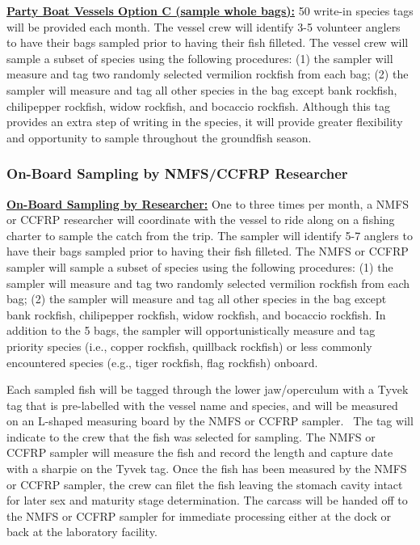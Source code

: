 \documentclass[
  letterpaper,
  DIV=11,
  numbers=noendperiod]{scrartcl}
\begin{document}
\href{https://drive.google.com/file/d/1rIka7pY_DXWL-FqTUodazEqWex9ovj0W/view?usp=sharing}{\textbf{Party
Boat Vessels Option C (sample whole bags):}} 50 write-in species tags
will be provided each month. The vessel crew will identify 3-5 volunteer
anglers to have their bags sampled prior to having their fish filleted.
The vessel crew will sample a subset of species using the following
procedures: (1) the sampler will measure and tag two randomly selected
vermilion rockfish from each bag; (2) the sampler will measure and tag
all other species in the bag except bank rockfish, chilipepper rockfish,
widow rockfish, and bocaccio rockfish. Although this tag provides an
extra step of writing in the species, it will provide greater
flexibility and opportunity to sample throughout the groundfish season.

\hypertarget{on-board-sampling-by-nmfsccfrp-researcher}{%
\subsubsection{On-Board Sampling by NMFS/CCFRP
Researcher}\label{on-board-sampling-by-nmfsccfrp-researcher}}

\href{https://drive.google.com/file/d/1o7kY7kULP_budD7yP4ZCjEFSpdjwJd3N/view?usp=sharing}{\textbf{On-Board
Sampling by Researcher:}} One to three times per month, a NMFS or CCFRP
researcher will coordinate with the vessel to ride along on a fishing
charter to sample the catch from the trip. The sampler will identify 5-7
anglers to have their bags sampled prior to having their fish filleted.
The NMFS or CCFRP sampler will sample a subset of species using the
following procedures: (1) the sampler will measure and tag two randomly
selected vermilion rockfish from each bag; (2) the sampler will measure
and tag all other species in the bag except bank rockfish, chilipepper
rockfish, widow rockfish, and bocaccio rockfish. In addition to the 5
bags, the sampler will opportunistically measure and tag priority
species (i.e., copper rockfish, quillback rockfish) or less commonly
encountered species (e.g., tiger rockfish, flag rockfish) onboard.~

Each sampled fish will be tagged through the lower jaw/operculum with a
Tyvek tag that is pre-labelled with the vessel name and species, and
will be measured on an L-shaped measuring board by the NMFS or CCFRP
sampler.~ The tag will indicate to the crew that the fish was selected
for sampling. The NMFS or CCFRP sampler will measure the fish and record
the length and capture date with a sharpie on the Tyvek tag. Once the
fish has been measured by the NMFS or CCFRP sampler, the crew can filet
the fish leaving the stomach cavity intact for later sex and maturity
stage determination. The carcass will be handed off to the NMFS or CCFRP
sampler for immediate processing either at the dock or back at the
laboratory facility.~~
\end{document}

